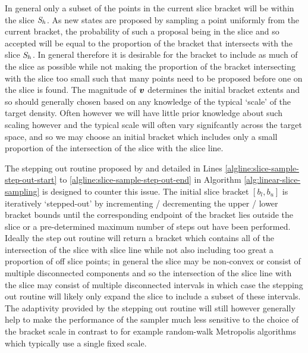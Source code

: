 In general only a subset of the points in the current slice bracket will be within the slice $\mathit{S}_h$. As new states are proposed by sampling a point uniformly from the current bracket, the probability of such a proposal being in the slice and so accepted will be equal to the proportion of the bracket that intersects with the slice $\mathit{S}_h$. In general therefore it is desirable for the bracket to include as much of the slice as possible while not making the proportion of the bracket intersecting with the slice too small such that many points need to be proposed before one on the slice is found. The magnitude of $\boldsymbol{v}$ determines the initial bracket extents and so should generally chosen based on any knowledge of the typical `scale' of the target density. Often however we will have little prior knowledge about such scaling however and the typical scale will often vary signifcantly across the target space, and so we may choose an initial bracket which includes only a small proportion of the intersection of the slice with the slice line.

The stepping out routine proposed by \citep{neal2003slice} and detailed in Lines \ref{algline:slice-sample-step-out-start} to \ref{algline:slice-sample-step-out-end} in Algorithm \ref{alg:linear-slice-sampling} is designed to counter this issue. The initial slice bracket $[b_l, b_u]$ is iteratively `stepped-out' by incrementing / decrementing the upper / lower bracket bounds until the corresponding endpoint of the bracket lies outside the slice or a pre-determined maximum number of steps out have been performed. Ideally the step out routine will return a bracket which contains all of the intersection of the slice with slice line while not also including too great a proportion of off slice points; in general the slice may be non-convex or consist of multiple disconnected components and so the intersection of the slice line with the slice may consist of multiple disconnected intervals in which case the stepping out routine will likely only expand the slice to include a subset of these intervals. The adaptivity provided by the stepping out routine will still however generally help to make the performance of the sampler much less sensitive to the choice of the bracket scale in contrast to for example random-walk Metropolis algorithms which typically use a single fixed scale. 

